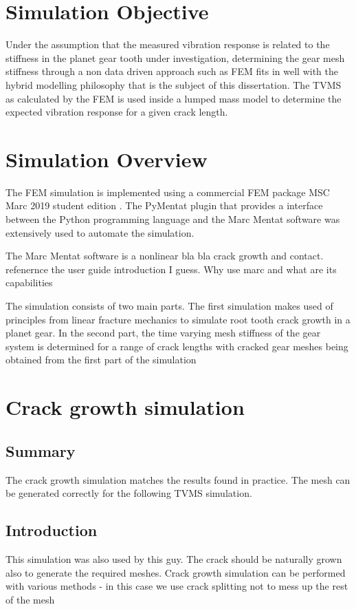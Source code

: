 \section{Simulation Objective}
Under the assumption that the measured vibration response is related to the stiffness in the planet gear tooth under investigation, determining the gear mesh stiffness through a non data driven approach such as FEM fits in well with the hybrid modelling philosophy that is the subject of this dissertation. The TVMS as calculated by the FEM is used inside a lumped mass model to determine the expected vibration response for a given crack length. 

\section{Simulation Overview}
The FEM simulation is implemented using a commercial FEM package MSC Marc 2019 student edition \cite{MSCMarc2019}. The PyMentat plugin \cite{Marc_Py2003} that provides a interface between the Python programming language and the Marc Mentat software was extensively used to automate the simulation. 

The Marc Mentat software  is a nonlinear bla bla crack growth and contact. refenernce the user guide introduction I guess. Why use marc and what are its capabilities
	
The simulation consists of two main parts. The first simulation makes used of principles from linear fracture mechanics to simulate root tooth crack growth in a planet gear. In the second part, the time varying mesh stiffness of the gear system is determined for a range of crack lengths with cracked gear meshes being obtained from the first part of the simulation


\section{Crack growth simulation}

\subsection{Summary}
The crack growth simulation matches the results found in practice. The mesh can be generated correctly for the following TVMS simulation.

\subsection{Introduction}
This simulation was also used by this guy. 
The crack should be naturally grown also to generate the required meshes.
Crack growth simulation can be performed with various methods - in this case we use crack splitting not to mess up the rest of the mesh

